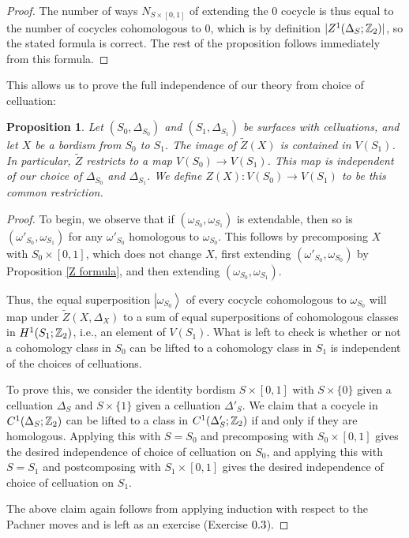 \documentclass{article}
\newtheorem{proposition}{Proposition}[section]
\theoremstyle{definition}
\numberwithin{figure}{section}
\begin{document}
\begin{proof}
The number of ways $N_{S\times [0,1]}$ of extending the $0$ cocycle is thus equal to the number of cocycles cohomologous to $0$, which is by definition $|Z^1(\Delta_S;\mathbb{Z}_2)|$, so the stated formula is correct. The rest of the proposition follows immediately from this formula.
\end{proof}

This allows us to prove the full independence of our theory from choice of celluation:

\begin{proposition}\label{S0S1 independence} Let $(S_0,\Delta_{S_0})$ and $\left(S_1,\Delta_{S_1}\right)$ be surfaces with celluations, and let $X$ be a bordism from $S_0$ to $S_1$. The image of $\tilde{Z}(X)$ is contained in $V(S_1)$. In particular, $\tilde{Z}$ restricts to a map $V(S_0)\xrightarrow{}V(S_1)$. This map is independent of our choice of $\Delta_{S_0}$ and $\Delta_{S_1}$. We define $Z(X): V(S_0)\xrightarrow{}V(S_1)$ to be this common restriction.
\end{proposition}
\begin{proof} To begin, we observe that if $(\omega_{S_0},\omega_{S_1})$ is extendable, then so is $(\omega'_{S_0},\omega_{S_1})$ for any $\omega'_{S_0}$ homologous to $\omega_{S_0}$. This follows by precomposing $X$ with $S_0\times [0,1]$, which does not change $X$, first extending $(\omega'_{S_0},\omega_{S_0})$ by Proposition \ref{Z formula}, and then extending $(\omega_{S_0},\omega_{S_1})$.

Thus, the equal superposition $\left|\omega_{S_0}\right>$ of every cocycle cohomologous to $\omega_{S_0}$ will map  under $\tilde{Z}(X,\Delta_X)$ to a sum of equal superpositions of cohomologous classes in $H^1(S_1;\mathbb{Z}_2)$, i.e., an element of $V(S_1)$. What is left to check is whether or not a cohomology class in $S_0$ can be lifted to a cohomology class in $S_1$ is independent of the choices of celluations.

To prove this, we consider the identity bordism $S\times [0,1]$ with $S\times \{0\}$ given a celluation $\Delta_{S}$ and $S\times \{1\}$ given a celluation $\Delta'_S$. We claim that a cocycle in $C^1(\Delta_{S};\mathbb{Z}_2)$ can be lifted to a class in $C^1(\Delta'_{S};\mathbb{Z}_2)$ if and only if they are homologous. Applying this with $S=S_0$ and precomposing with $S_0\times [0,1]$ gives the desired independence of choice of celluation on $S_0$, and applying this with $S=S_1$ and postcomposing with $S_1\times [0,1]$ gives the desired independence of choice of celluation on $S_1$.

The above claim again follows from applying induction with respect to the Pachner moves and is left as an exercise (Exercise $\thesection.3$).
\end{proof}
\end{document}
